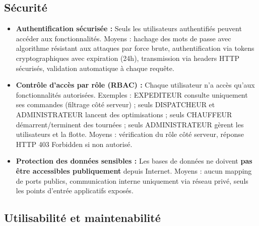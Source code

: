 \documentclass[12pt,a4paper]{report}
\begin{document}
\subsection{Sécurité}

\begin{itemize}[leftmargin=2.2em]
    \item \textbf{Authentification sécurisée :} Seuls les utilisateurs authentifiés peuvent accéder aux fonctionnalités. Moyens : hachage des mots de passe avec algorithme résistant aux attaques par force brute, authentification via tokens cryptographiques avec expiration (24h), transmission via headers HTTP sécurisés, validation automatique à chaque requête.

    \item \textbf{Contrôle d'accès par rôle (RBAC) :} Chaque utilisateur n'a accès qu'aux fonctionnalités autorisées. Exemples : EXPEDITEUR consulte uniquement ses commandes (filtrage côté serveur) ; seuls DISPATCHEUR et ADMINISTRATEUR lancent des optimisations ; seuls CHAUFFEUR démarrent/terminent des tournées ; seuls ADMINISTRATEUR gèrent les utilisateurs et la flotte. Moyens : vérification du rôle côté serveur, réponse HTTP 403 Forbidden si non autorisé.

    \item \textbf{Protection des données sensibles :} Les bases de données ne doivent \textbf{pas être accessibles publiquement} depuis Internet. Moyens : aucun mapping de ports publics, communication interne uniquement via réseau privé, seuls les points d'entrée applicatifs exposés.
\end{itemize}

\subsection{Utilisabilité et maintenabilité}
\end{document}
